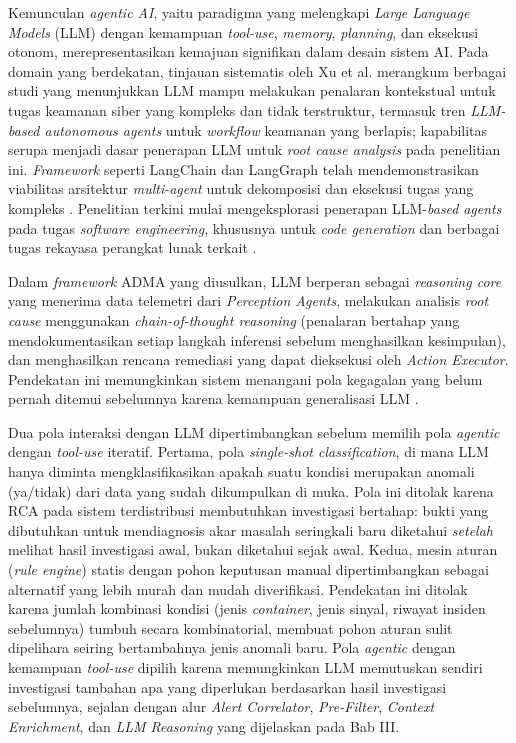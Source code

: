 Kemunculan \textit{agentic AI}, yaitu paradigma yang melengkapi \textit{Large Language Models} (LLM) dengan kemampuan \textit{tool-use}, \textit{memory}, \textit{planning}, dan eksekusi otonom, merepresentasikan kemajuan signifikan dalam desain sistem AI. Pada domain yang berdekatan, tinjauan sistematis oleh Xu et al. \cite{xu2025large} merangkum berbagai studi yang menunjukkan LLM mampu melakukan penalaran kontekstual untuk tugas keamanan siber yang kompleks dan tidak terstruktur, termasuk tren \textit{LLM-based autonomous agents} untuk \textit{workflow} keamanan yang berlapis; kapabilitas serupa menjadi dasar penerapan LLM untuk \textit{root cause analysis} pada penelitian ini. \textit{Framework} seperti LangChain dan LangGraph telah mendemonstrasikan viabilitas arsitektur \textit{multi-agent} untuk dekomposisi dan eksekusi tugas yang kompleks \cite{brodimas2025intent}. Penelitian terkini mulai mengeksplorasi penerapan LLM-\textit{based} \textit{agents} pada tugas \textit{software engineering}, khususnya untuk \textit{code generation} dan berbagai tugas rekayasa perangkat lunak terkait \cite{jiang2025survey}.

Dalam \textit{framework} ADMA yang diusulkan, LLM berperan sebagai \textit{reasoning core} yang menerima data telemetri dari \textit{Perception Agents}, melakukan analisis \textit{root cause} menggunakan \textit{chain-of-thought reasoning} (penalaran bertahap yang mendokumentasikan setiap langkah inferensi sebelum menghasilkan kesimpulan), dan menghasilkan rencana remediasi yang dapat dieksekusi oleh \textit{Action Executor}. Pendekatan ini memungkinkan sistem menangani pola kegagalan yang belum pernah ditemui sebelumnya karena kemampuan generalisasi LLM \cite{xu2025large}.

Dua pola interaksi dengan LLM dipertimbangkan sebelum memilih pola \textit{agentic} dengan \textit{tool-use} iteratif. Pertama, pola \textit{single-shot classification}, di mana LLM hanya diminta mengklasifikasikan apakah suatu kondisi merupakan anomali (ya/tidak) dari data yang sudah dikumpulkan di muka. Pola ini ditolak karena RCA pada sistem terdistribusi membutuhkan investigasi bertahap: bukti yang dibutuhkan untuk mendiagnosis akar masalah seringkali baru diketahui \textit{setelah} melihat hasil investigasi awal, bukan diketahui sejak awal. Kedua, mesin aturan (\textit{rule engine}) statis dengan pohon keputusan manual dipertimbangkan sebagai alternatif yang lebih murah dan mudah diverifikasi. Pendekatan ini ditolak karena jumlah kombinasi kondisi (jenis \textit{container}, jenis sinyal, riwayat insiden sebelumnya) tumbuh secara kombinatorial, membuat pohon aturan sulit dipelihara seiring bertambahnya jenis anomali baru. Pola \textit{agentic} dengan kemampuan \textit{tool-use} dipilih karena memungkinkan LLM memutuskan sendiri investigasi tambahan apa yang diperlukan berdasarkan hasil investigasi sebelumnya, sejalan dengan alur \textit{Alert Correlator}, \textit{Pre-Filter}, \textit{Context Enrichment}, dan \textit{LLM Reasoning} yang dijelaskan pada Bab III.

